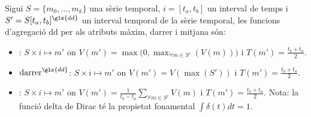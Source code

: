 \begin{definition}
  Sigui $S=\{m_0,\dotsc,m_k\}$ una sèrie temporal, $i=[t_a,t_b]$ un
  interval de temps i $S'=S[t_a,t_b]^{\gls{dd}}$ un interval temporal
  de la sèrie temporal, les funcions d'agregació \gls{dd} per als
  atributs màxim, darrer i mitjana són:
\begin{itemize}
\item {}: $S
  \times i \mapsto m'$ on $V(m') = \max\big(0,\max_{\forall m \in
    S'}(V(m))\big)$ i $T(m')=\frac{t_b+t_a}{2}$. 

\item $\operatorname{darrer}^{\gls{dd}}$: $S \times i \mapsto m'$ on $V(m') =
  V(\max(S'))$ i $T(m')=\frac{t_b+t_a}{2}$.

\item {}: $S \times i \mapsto m'$ on
  $V(m') = \frac{1}{t_b-t_a}\sum\limits_{\forall m \in S'} V(m)$ i
  $T(m')=\frac{t_b+t_a}{2}$. Nota: la funció delta de Dirac té la
  propietat fonamental $\int \delta(t)dt = 1$. 
\end{itemize}
\end{definition}




